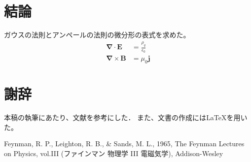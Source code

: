 \documentclass[11pt]{jarticle}
\begin{document}
\section{結論}
ガウスの法則とアンペールの法則の微分形の表式を求めた。
\begin{align} %
  \bm{\nabla \cdot E} &= \frac{\rho_q}{\epsilon_0} \\
  \bm{\nabla \times B} &= \mu_0 \bm{j}
\end{align}

\section*{謝辞} %
本稿の執筆にあたり、文献\cite{fls65}を参考にした．%
また、文書の作成には{\LaTeX}を用いた。

\begin{thebibliography}{99} %
  Feynman, R. P., Leighton, R. B., \& Sands, M. L., 1965, The Feynman Lectures on Physics, vol.III (ファインマン 物理学 III 電磁気学), Addison-Wesley
\end{thebibliography} %
\end{document}
